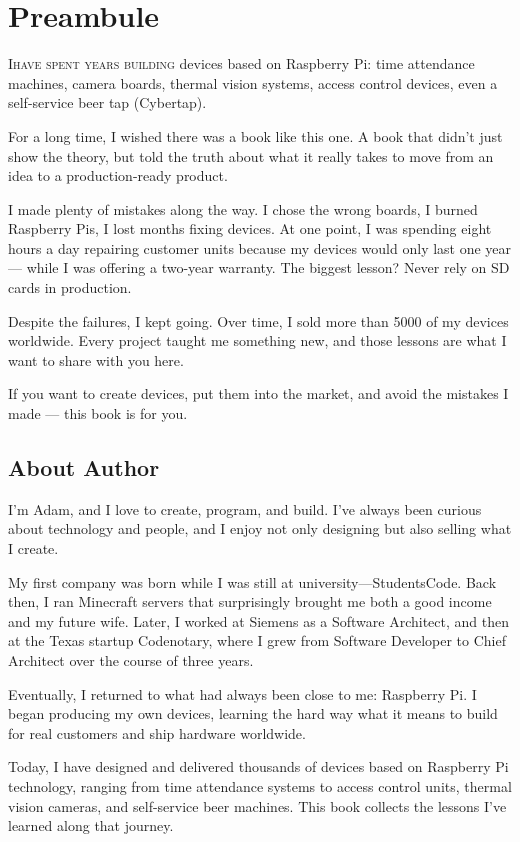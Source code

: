 \chapter{Preambule}

\lettrine{I}{have spent years building} devices based on Raspberry Pi: time attendance machines, camera boards, thermal vision systems, access control devices, even a self-service beer tap (Cybertap).


For a long time, I wished there was a book like this one. A book that didn’t just show the theory, but told the truth about what it really takes to move from an idea to a production-ready product.

I made plenty of mistakes along the way. I chose the wrong boards, I burned Raspberry Pis, I lost months fixing devices. At one point, I was spending eight hours a day repairing customer units because my devices would only last one year — while I was offering a two-year warranty. The biggest lesson? Never rely on SD cards in production.

Despite the failures, I kept going. Over time, I sold more than 5000 of my devices worldwide. Every project taught me something new, and those lessons are what I want to share with you here.

If you want to create devices, put them into the market, and avoid the mistakes I made — this book is for you.

\section*{About Author}

I’m Adam, and I love to create, program, and build. I’ve always been curious about technology and people, and I enjoy not only designing but also selling what I create.

My first company was born while I was still at university—StudentsCode. Back then, I ran Minecraft servers that surprisingly brought me both a good income and my future wife. Later, I worked at Siemens as a Software Architect, and then at the Texas startup Codenotary, where I grew from Software Developer to Chief Architect over the course of three years.

Eventually, I returned to what had always been close to me: Raspberry Pi. I began producing my own devices, learning the hard way what it means to build for real customers and ship hardware worldwide.

Today, I have designed and delivered thousands of devices based on Raspberry Pi technology, ranging from time attendance systems to access control units, thermal vision cameras, and self-service beer machines. This book collects the lessons I’ve learned along that journey.

\cleardoublepage   %